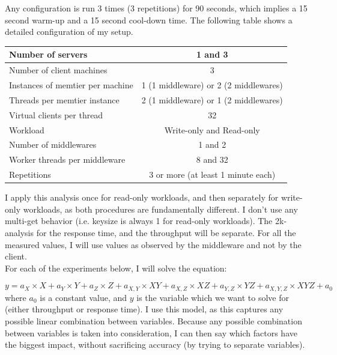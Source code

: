 \documentclass[11pt,a4paper]{article}
\begin{document}
Any configuration is run 3 times (3 repetitions) for 90 seconds, which implies a 15 second warm-up and a 15 second cool-down time.
The following table shows a detailed configuration of my setup.

\begin{center}
	\scriptsize{
		\begin{tabular}{|l|c|}
			\hline Number of servers                & 1 and 3                                     \\ 
			\hline Number of client machines        & 3                                           \\ 
			\hline Instances of memtier per machine & 1 (1 middleware) or 2 (2 middlewares) \\ 
			\hline Threads per memtier instance     & 2 (1 middleware) or 1 (2 middlewares)   \\
			\hline Virtual clients per thread       &  32                                     \\ 
			\hline Workload                         & Write-only and Read-only\\
			\hline Number of middlewares            & 1 and 2                                     \\
			\hline Worker threads per middleware    & 8 and 32                                    \\
			\hline Repetitions                      & 3 or more (at least 1 minute each)                                   \\ 
			\hline 
		\end{tabular}
	} 
\end{center}

I apply this analysis once for read-only workloads, and then separately for write-only workloads, as both procedures are fundamentally different.
I don't use any multi-get behavior (i.e. keysize is always 1 for read-only workloads).
The 2k-analysis for the response time, and the throughput will be separate.
For all the measured values, I will use values as observed by the middleware and not by the client. \\

For each of the experiments below, I will solve the equation:

\begin{equation}
	y = a_X \times X + a_Y \times Y + a_Z \times Z + a_{X, Y} \times X Y + a_{X, Z} \times X Z + a_{Y, Z} \times Y Z + a_{X, Y, Z} \times X Y Z + a_0
\end{equation}
where $a_0$ is a constant value, and $y$ is the variable which we want to solve for (either throughput or response time).
I use this model, as this captures any possible linear combination between variables.
Because any possible combination between variables is taken into consideration, I can then say which factors have the biggest impact, without sacrificing accuracy (by trying to separate variables).
\end{document}
